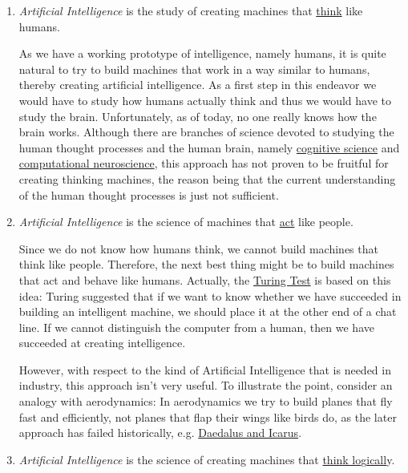\begin{enumerate}
\item \emph{Artificial Intelligence} is the study of creating machines that \underline{think} like humans.

      As we have a working prototype of intelligence, namely humans, it is quite natural to try to
      build machines that work in a way similar to humans, thereby creating artificial
      intelligence.  As a first step in this endeavor we would have to study how humans actually
      think and thus we would have to study the brain.  Unfortunately, as of today, no one really
      knows how the brain works.  Although there are branches of science devoted to studying the
      human thought processes and the human brain, namely
      \href{https://en.wikipedia.org/wiki/Cognitive_science}{cognitive science} and 
      \href{https://en.wikipedia.org/wiki/Computational_neuroscience}{computational neuroscience},
      this approach has not proven to be fruitful for creating thinking machines, the reason being
      that the current understanding of the human thought processes is just not sufficient.  

\item \emph{Artificial Intelligence} is the science of machines that \underline{act} like people.

      Since we do not know how humans think,  we cannot build machines that think like people.
      Therefore, the next best thing might be to build  machines that act and behave like humans.  
      Actually, the \href{https://en.wikipedia.org/wiki/Turing_test}{Turing Test} is based on this
      idea:  Turing suggested that if we want to know whether we have succeeded in building an
      intelligent machine, we should place it at the other end of a chat line.  If we cannot
      distinguish the computer from a human, then we have succeeded at creating intelligence. 

      However, with respect to the kind of Artificial Intelligence that is needed in industry, this
      approach isn't very useful.  To illustrate the point, consider an analogy with aerodynamics:
      In aerodynamics we try to build planes that fly fast and efficiently, not planes that flap
      their wings like birds do, as the later approach has failed historically, e.g. 
      \href{https://en.wikipedia.org/wiki/Daedalus#Daedalus_and_Icarus}{Daedalus and Icarus}.
\item \emph{Artificial Intelligence} is the science of creating machines that \underline{think lo}g\underline{icall}y.


\end{enumerate}
